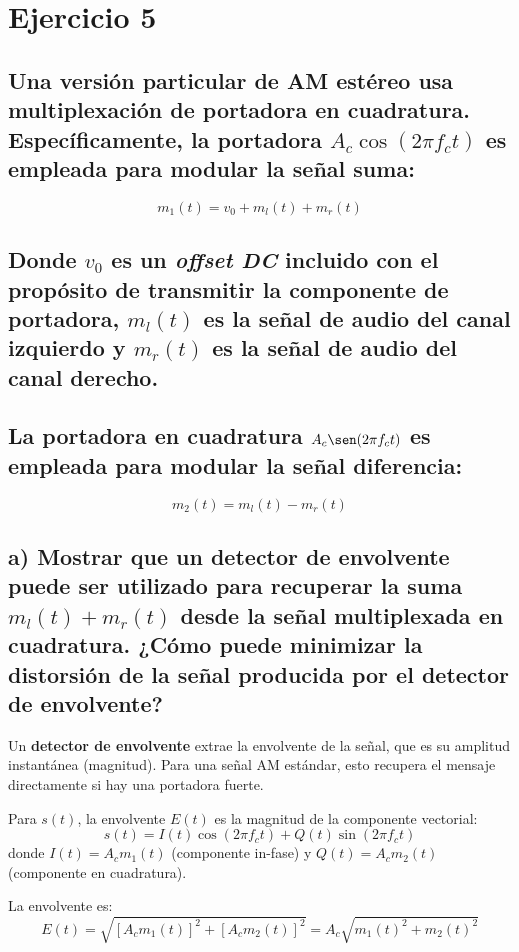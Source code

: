 \section{Ejercicio 5}

{\subsection*{Una versión particular de AM estéreo usa multiplexación de portadora en cuadratura. Específicamente, la portadora $A_c \cos(2\pi f_c t)$ es empleada para modular la señal suma:}

    \[
        m_1(t) = v_0 + m_l(t) + m_r(t)
    \]

\subsection*{Donde $v_0$ es un \textit{offset DC} incluido con el propósito de transmitir la componente de portadora, 
$m_l(t)$ es la señal de audio del canal izquierdo y $m_r(t)$ es la señal de audio del canal derecho.}

\subsection*{La portadora en cuadratura $A_c \sen(2\pi f_c t)$ es empleada para modular la señal diferencia:}

    \[
        m_2(t) = m_l(t) - m_r(t)
    \]

\subsection*{a) Mostrar que un detector de envolvente puede ser utilizado para recuperar la suma $m_l(t) + m_r(t)$ desde la señal multiplexada en cuadratura. 
¿Cómo puede minimizar la distorsión de la señal producida por el detector de envolvente?}


Un \textbf{detector de envolvente} extrae la envolvente de la señal, que es su amplitud instantánea (magnitud). Para una señal AM estándar, esto recupera el mensaje directamente si hay una portadora fuerte.

Para $s(t)$, la envolvente $E(t)$ es la magnitud de la componente vectorial:
\[ s(t) = I(t) \cos(2\pi f_c t) + Q(t) \sin(2\pi f_c t) \]
donde $I(t) = A_c m_1(t)$ (componente in-fase) y $Q(t) = A_c m_2(t)$ (componente en cuadratura).

La envolvente es:
\[ E(t) = \sqrt{ [A_c m_1(t)]^2 + [A_c m_2(t)]^2 } = A_c \sqrt{ m_1(t)^2 + m_2(t)^2 } \]

}
